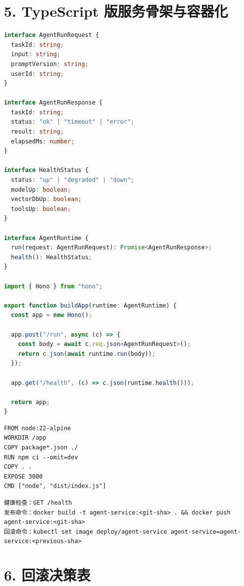 \documentclass[9pt,a4paper,twocolumn]{ctexart}
\begin{document}
\section*{5. TypeScript 版服务骨架与容器化}


\begin{lstlisting}[language=TypeScript]
interface AgentRunRequest {
  taskId: string;
  input: string;
  promptVersion: string;
  userId: string;
}

interface AgentRunResponse {
  taskId: string;
  status: "ok" | "timeout" | "error";
  result: string;
  elapsedMs: number;
}

interface HealthStatus {
  status: "up" | "degraded" | "down";
  modelUp: boolean;
  vectorDbUp: boolean;
  toolsUp: boolean;
}

interface AgentRuntime {
  run(request: AgentRunRequest): Promise<AgentRunResponse>;
  health(): HealthStatus;
}

import { Hono } from "hono";

export function buildApp(runtime: AgentRuntime) {
  const app = new Hono();

  app.post("/run", async (c) => {
    const body = await c.req.json<AgentRunRequest>();
    return c.json(await runtime.run(body));
  });

  app.get("/health", (c) => c.json(runtime.health()));

  return app;
}
\end{lstlisting}



\begin{lstlisting}
FROM node:22-alpine
WORKDIR /app
COPY package*.json ./
RUN npm ci --omit=dev
COPY . .
EXPOSE 3000
CMD ["node", "dist/index.js"]
\end{lstlisting}



\begin{lstlisting}
健康检查：GET /health
发布命令：docker build -t agent-service:<git-sha> . && docker push agent-service:<git-sha>
回滚命令：kubectl set image deploy/agent-service agent-service=agent-service:<previous-sha>
\end{lstlisting}



\section*{6. 回滚决策表}
\end{document}
